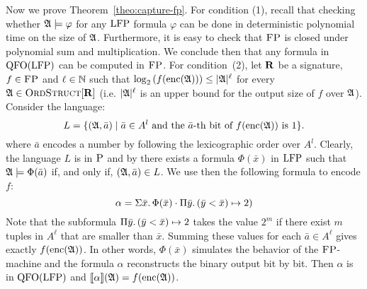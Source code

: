 Now we prove Theorem~\ref{theo:capture-fp}. For condition (1), recall that checking whether $\mathfrak{A}\models\varphi$ for any ${\rm LFP}$ formula $\varphi$ can be done in deterministic polynomial time on the size of $\mathfrak{A}$\cite{I83}. 
Furthermore, it is easy to check that $\text{\sc FP}$ is closed under polynomial sum and multiplication. 
We conclude then that any formula in ${\rm QFO}({\rm LFP})$ can be computed in $\text{\sc FP}$.	
For condition~(2), let $\mathbf{R}$ be a signature, $f\in \text{\sc FP}$
and $\ell\in\mathbb{N}$ such that $\log_2\left(f({\rm enc}(\mathfrak{A})) \right) \leq \vert \mathfrak{A} \vert^\ell$ for every $\mathfrak{A}\in\text{\sc OrdStruct}[\mathbf{R}]$ (i.e. $\vert \mathfrak{A} \vert^\ell$ is an upper bound for the output size of $f$ over $\mathfrak{A}$).
Consider the language:
\[
L = \{(\mathfrak{A},\bar{a})\mid \bar{a} \in A^l \text{ and the } \bar{a}\text{-th bit of }f({\rm enc}(\mathfrak{A}))\text{ is 1}\}.
\]
where $\bar{a}$ encodes a number by following the lexicographic order over $A^l$.
Clearly, the language $L$ is in $\text{\sc P}$ and by \cite{I83} there exists a formula $\Phi(\bar{x})$ in ${\rm LFP}$ such that $\mathfrak{A}\models\Phi(\bar{a})$ if, and only if, $(\mathfrak{A},\bar{a})\in L$. 
We use then the following formula to encode $f$:
$$
\alpha = \Sigma{\bar{x}}.\, \Phi(\bar{x})\cdot \Pi{\bar{y}}.\,(\bar{y} < \bar{x}) \mapsto 2)$$
Note that the subformula $\Pi{\bar{y}}.\,(\bar{y} < \bar{x}) \mapsto 2$ takes the value $2^m$ if there exist $m$ tuples in $A^{\ell}$ that are smaller than $\bar{x}$. Summing these values for each $\bar{a}\in A^{\ell}$ gives exactly $f({\rm enc}(\mathfrak{A}))$. 
In other words, $\Phi(\bar{x})$ simulates the behavior of the $\text{\sc FP}$-machine and the formula $\alpha$ reconstructs the binary output bit by bit.
Then $\alpha$ is in ${\rm QFO}({\rm LFP})$ and ${\llbracket{}{\alpha}\rrbracket}(\mathfrak{A}) = f({\rm enc}(\mathfrak{A}))$.
